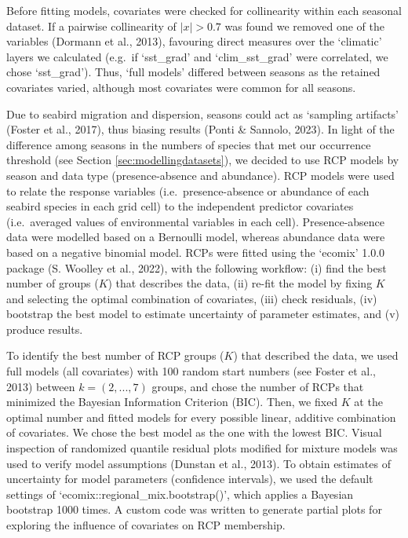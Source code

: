 \documentclass{article}
\begin{document}
\begin{linenumbers}
Before fitting models, covariates were checked for collinearity within each seasonal dataset. If a pairwise collinearity of \(\left|x\right| >0.7\) was found we removed one of the variables (Dormann et al., 2013), favouring direct measures over the `climatic' layers we calculated (e.g.~if `sst\_grad' and `clim\_sst\_grad' were correlated, we chose `sst\_grad'). Thus, `full models' differed between seasons as the retained covariates varied, although most covariates were common for all seasons.

Due to seabird migration and dispersion, seasons could act as `sampling artifacts' (Foster et al., 2017), thus biasing results (Ponti \& Sannolo, 2023). In light of the difference among seasons in the numbers of species that met our occurrence threshold (see Section \ref{sec:modellingdatasets}), we decided to use RCP models by season and data type (presence-absence and abundance). RCP models were used to relate the response variables (i.e.~presence-absence or abundance of each seabird species in each grid cell) to the independent predictor covariates (i.e.~averaged values of environmental variables in each cell). Presence-absence data were modelled based on a Bernoulli model, whereas abundance data were based on a negative binomial model. RCPs were fitted using the `ecomix' 1.0.0 package (S. Woolley et al., 2022), with the following workflow: (i) find the best number of groups (\(K\)) that describes the data, (ii) re-fit the model by fixing \(K\) and selecting the optimal combination of covariates, (iii) check residuals, (iv) bootstrap the best model to estimate uncertainty of parameter estimates, and (v) produce results.

To identify the best number of RCP groups (\(K\)) that described the data, we used full models (all covariates) with 100 random start numbers (see Foster et al., 2013) between \(k = (2, ..., 7)\) groups, and chose the number of RCPs that minimized the Bayesian Information Criterion (BIC). Then, we fixed \(K\) at the optimal number and fitted models for every possible linear, additive combination of covariates. We chose the best model as the one with the lowest BIC. Visual inspection of randomized quantile residual plots modified for mixture models was used to verify model assumptions (Dunstan et al., 2013). To obtain estimates of uncertainty for model parameters (confidence intervals), we used the default settings of `ecomix::regional\_mix.bootstrap()', which applies a Bayesian bootstrap 1000 times. A custom code was written to generate partial plots for exploring the influence of covariates on RCP membership.


\end{linenumbers}
\end{document}
